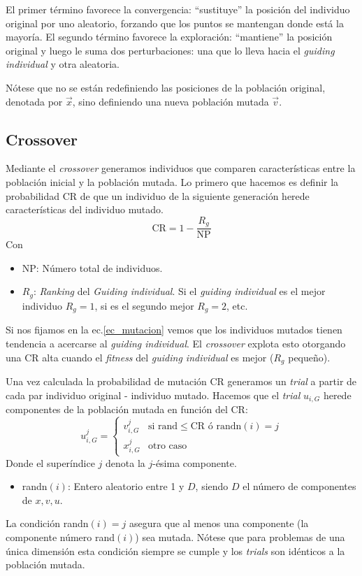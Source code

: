 \documentclass{article}
\begin{document}
El primer término favorece la convergencia: ``sustituye'' la posición del individuo original por uno aleatorio, forzando que los puntos se mantengan donde está la mayoría.  
El segundo término favorece la exploración: ``mantiene'' la posición original y luego le suma dos perturbaciones: una que lo lleva hacia el \textit{guiding individual} y otra aleatoria.

Nótese que no se están redefiniendo las posiciones de la población original, denotada por $\vec{x}$, sino definiendo una nueva población mutada $\vec{v}$.
\subsection{Crossover}
Mediante el \textit{crossover} generamos individuos que comparen características entre la población inicial y la población mutada. Lo primero que hacemos es definir la probabilidad CR de que un individuo de la siguiente generación herede características del individuo mutado.
\begin{equation}
    \text{CR} = 1 - \frac{R_g}{\text{NP}}
    \label{ec_CR}
\end{equation}
Con
\begin{itemize}
    \item NP: Número total de individuos.
    \item $R_g$: \textit{Ranking} del \textit{Guiding individual}. Si el \textit{guiding individual} es el mejor individuo $R_g=1$, si es el segundo mejor $R_g=2$, etc.
\end{itemize}
Si nos fijamos en la ec.\eqref{ec_mutacion} vemos que los individuos mutados tienen tendencia a acercarse al \textit{guiding individual}. El \textit{crossover} explota esto otorgando una CR alta cuando el \textit{fitness} del \textit{guiding individual} es mejor ($R_g$ pequeño).

Una vez calculada la probabilidad de mutación CR generamos un \textit{trial} a partir de cada par individuo original - individuo mutado. Hacemos que el \textit{trial} $u_{i,G}$ herede componentes de la población mutada en función del CR:
\begin{equation}
    u_{i,G}^j = \left\{\begin{array}{ll}
        v_{i,G}^j&\text{si rand}\le\text{CR ó randn}(i)=j\\
        x_{i,G}^j&\text{otro caso}
        \end{array}\right.
    \label{ec_crossover}
\end{equation}
Donde el superíndice $j$ denota la $j$-ésima componente. 
\begin{itemize}
    \item randn$(i)$: Entero aleatorio entre 1 y $D$, siendo $D$ el número de componentes de $x, v, u$.
\end{itemize}
La condición randn$(i)=j$ asegura que al menos una componente (la componente número rand$(i)$) sea mutada. Nótese que para problemas de una única dimensión esta condición siempre se cumple y los \textit{trials} son idénticos a la población mutada.
\end{document}
